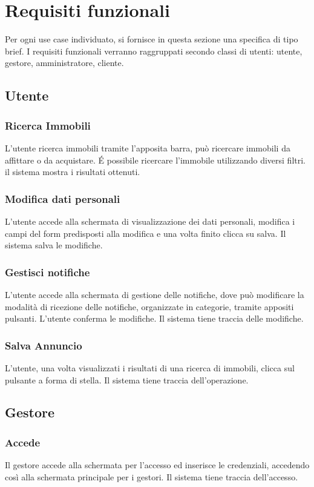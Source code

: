 \section{Requisiti funzionali}
Per ogni use case individuato, si fornisce in questa sezione una
specifica di tipo brief.
I requisiti funzionali verranno raggruppati secondo
classi di utenti: utente, gestore, amministratore, cliente.

\subsection{Utente}
\subsubsection{Ricerca Immobili}
L'utente ricerca immobili tramite l'apposita barra, può ricercare 
immobili da affittare o da acquistare. É possibile ricercare 
l'immobile utilizzando diversi filtri. il sistema mostra i risultati ottenuti.

\subsubsection{Modifica dati personali}
L'utente accede alla schermata di visualizzazione dei dati personali, modifica 
i campi del form predisposti alla modifica e una volta finito clicca su salva. 
Il sistema salva le modifiche.

\subsubsection{Gestisci notifiche}
L'utente accede alla schermata di gestione delle notifiche, dove
può modificare la modalità di ricezione delle notifiche, organizzate 
in categorie, tramite appositi pulsanti. L'utente conferma le modifiche. 
Il sistema tiene traccia delle modifiche.

\subsubsection{Salva Annuncio}
L'utente, una volta visualizzati i risultati di una ricerca di immobili,
clicca sul pulsante a forma di stella. Il sistema tiene traccia
dell'operazione.

\subsection{Gestore}
\subsubsection{Accede}
Il gestore accede alla schermata per l'accesso ed inserisce le credenziali, 
accedendo così alla schermata principale per i gestori. Il sistema tiene 
traccia dell'accesso.

